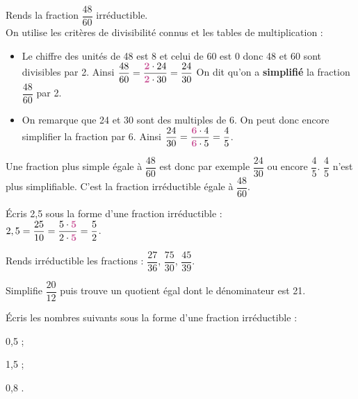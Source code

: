 \begin{methode*1}

\begin{exemple*1}
Rends la fraction $\dfrac{48}{60}$ irréductible. \\[1em]
On utilise les critères de divisibilité connus et les tables de multiplication :
\begin{itemize}
 \item Le chiffre des unités de 48 est 8 et celui de 60 est 0 donc 48 et 60 sont divisibles par 2. 
Ainsi $\dfrac{48}{60} = \dfrac{\text{\textbf{\textcolor{C2}{2}}} \cdot 24}{\text{\textbf{\textcolor{C2}{2}}} \cdot 30} = \dfrac{24}{30}$ On dit qu'on a \textbf{simplifié} la fraction $\dfrac{48}{60}$ par 2.
 \item On remarque que 24 et 30 sont des multiples de 6. On peut donc encore simplifier la fraction par 6.
 Ainsi $\dfrac{24}{30} = \dfrac{\text{\textbf{\textcolor{C2}{6}}} \cdot 4}{\text{\textbf{\textcolor{C2}{6}}} \cdot 5} = \dfrac{4}{5}$.
 \end{itemize}
Une fraction plus simple égale à $\dfrac{48}{60}$ est donc par exemple $\dfrac{24}{30}$ ou encore $\dfrac{4}{5}$.
$\dfrac{4}{5}$ n'est plus simplifiable. C'est la fraction irréductible égale à $\dfrac{48}{60}$.
 \end{exemple*1}
 
\begin{exemple*1}
Écris 2,5 sous la forme d'une fraction irréductible : \\[1em]
$2,5 = \dfrac{25}{10} = \dfrac{5 \cdot \text{\textbf{\textcolor{C2}{5}}}}{2 \cdot \text{\textbf{\textcolor{C2}{5}}}} = \dfrac{5}{2}$.
 \end{exemple*1}
 
 
  \exercice
Rends irréductible les fractions : $\dfrac{27}{36}$, $\dfrac{75}{30}$, $\dfrac{45}{39}$.

  \exercice
Simplifie $\dfrac{20}{12}$ puis trouve un quotient égal dont le dénominateur est 21.

  \exercice
Écris les nombres suivants sous la forme d'une fraction irréductible :
\begin{colenumerate}{3}
 \item 0,5 \dotfill;
 \item 1,5 \dotfill;
 \item 0,8 \dotfill.
 \end{colenumerate}

 \end{methode*1}

